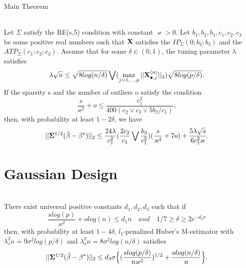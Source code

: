 \documentclass[unknownkeysallowed]{beamer}
\begin{document}
\begin{frame}{Main Theorem}
	\begin{theorem}\ \\
		Let $\Sigma$ satisfy the RE(s,5) condition with constant $\varkappa > 0$. Let $b_1,b_2,b_3, c_1, c_2, c_3$ be some positive real numbers such that $\bold{X}$ satisfies the $IP_{\Sigma}(0;b_2;b_3)$ and the $ATP_{\Sigma}(c_1;c_2;c_3)$. Assume that for some $\delta \in (0,1)$, the tuning parameter $\lambda$ satisfies
		\begin{equation*}
		\lambda \sqrt{n} \leq \sqrt{8 log(n/\delta)} \bigvee (\max\limits_{j = 1,...,p}||\bold{X}_{\bullet, j}^{(n)}||_2)\sqrt{8log(p/\delta)}.
		\end{equation*}
		If the sparsity s and the number of outliers o satisfy the condition
		\begin{equation*}
		\frac{s}{\varkappa^2} + o \leq \frac{c_1^2}{400(c_2 \vee c_3 \vee 5b_2/c_1)},
		\end{equation*}
		then, with probability at least $1-2\delta$, we have
		\begin{equation*}
		||\bold{\Sigma}^{1/2}(\hat{\beta}- \beta^*)||_2 \leq \frac{24\lambda}{c_1^2}(\frac{2c_2}{
			c_1} \bigvee \frac{b_3}{c_1^2}) (\frac{s}{\varkappa^2} + 7o) + \frac{5\lambda\sqrt{s}}{6c_1^2\varkappa}.
		\end{equation*}
	\end{theorem}
\end{frame}


\section{Gaussian Design}

\begin{frame}{}
	\begin{theorem}\ \\
		There exist universal positive constants $d_1, d_2, d_3$ such that if
		\begin{equation}
		\frac{s log(p)}{\varkappa^2} + o log(n) \leq d_1n \quad and \quad 1/7 \geq \delta \geq 2e^{-d_2n}
		\end{equation}
		then, with probability at least $1-4\delta$, $l_1$-penalized Huber's M-estimator with $\lambda^2_sn = 9\sigma^2 log (p/\delta)$ and $\lambda^2_on = 8\sigma^2 log (n/\delta)$ satisfies
		\begin{equation*}
		||\bold{\Sigma}^{1/2}(\hat{\beta}-\beta^*)||_2 \leq d_3 \sigma \Big\{ (\frac{slog(p/\delta)}{n\varkappa^2})^{1/2} + \frac{olog(n/\delta)}{n} \Big\}.
		\end{equation*}
	\end{theorem}

\end{frame}
\end{document}
